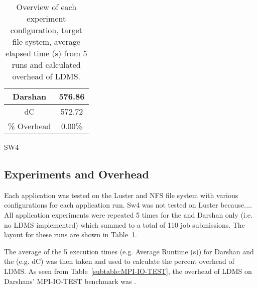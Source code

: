 \begin{table}[h]
\begin{subtable}[h]{0.2\textwidth}
\begin{tabular}{|ccl|}
        \multicolumn{1}{|c|}{Darshan}          & \multicolumn{2}{c|}{576.86}       \\ \hline
        \multicolumn{1}{|c|}{dC} & \multicolumn{2}{c|}{572.72}       \\ \hline
        \multicolumn{1}{|c|}{\% Overhead}      & \multicolumn{2}{c|}{0.00\%}      \\ \hline
        \end{tabular}
    \caption{SW4} 
    \label{subtable:SW4}
\end{subtable}
\caption{Overview of each experiment configuration, target file system, average elapsed time (s) from 5 runs and calculated overhead of LDMS.}
\label{table:apps}
\end{table}

\subsection{Experiments and Overhead}
Each application was tested on the Luster and NFS file system with various configurations for each application run. Sw4 was not tested on Luster because.... All application experiments were repeated 5 times for the \connector{} and Darshan only (i.e. no LDMS implemented) which summed to a total of 110 job submissions. The layout for these runs are shown in Table~\ref{table:apps}.  



The average of the 5 execution times (e.g. Average Runtime (s)) for Darshan and the \connector{} (e.g. dC) was then taken and used to calculate the percent overhead of LDMS. As seen from Table~\ref{subtable:MPI-IO-TEST}, the overhead of LDMS on Darshans' MPI-IO-TEST benchmark was .



